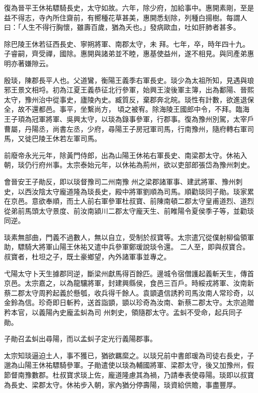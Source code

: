 \begin{pinyinscope}
 復為晉平王休祐驃騎長史，太守如故。六年，除少府，加給事中。惠開素剛，至是益不得志，寺內所住齋前，有嚮種花草甚美，惠開悉刬除，列種白揚樹。每謂人曰：「人生不得行胸懷，雖壽百歲，猶為夭也。」發病歐血，吐如肝肺者甚多。



 除巴陵王休若征西長史、寧朔將軍、南郡太守，未
 拜。七年，卒，時年四十九。子睿嗣，齊受禪，國除。惠開與諸弟並不睦，惠基使益州，遂不相見。與同產弟惠明亦著嫌隙云。



 殷琰，陳郡長平人也。父道鸞，衡陽王義季右軍長史。琰少為太祖所知，見遇與琅邪王景文相埒。初為江夏王義恭征北行參軍，始興王浚後軍主簿，出為鄱陽、晉熙太守，豫州治中從事史，廬陵內史。臧質反，棄郡奔北皖。琰性有計數，欲進退保全，故不還都邑。事平，坐繫尚方，
 頃之被宥。除海陵王國郎中令，不拜。臨海王子頊為冠軍將軍、吳興太守，以琰為錄事參軍，行郡事。復為豫州別駕，太宰戶曹屬，丹陽丞，尚書左丞，少府，尋陽王子房冠軍司馬，行南豫州，隨府轉右軍司馬，又徙巴陵王休若左軍司馬。



 前廢帝永光元年，除黃門侍郎，出為山陽王休祐右軍長史、南梁郡太守。休祐入朝，琰仍行府州事。太宗泰始元年，以休祐為荊州，欲以吏部郎張岱為豫州刺史。



 會晉安王子勛反，即以琰督豫司二州南豫
 州之梁郡諸軍事、建武將軍、豫州刺史，以西汝陰太守龐道隆為琰長史，殿中將軍劉順為司馬。順勸琰同子勛。琰家累在京邑。意欲奉順，而土人前右軍參軍杜叔寶、前陳南頓二郡太守皇甫道烈、道烈從弟前馬頭太守景度、前汝南潁川二郡太守龐天生、前睢陽令夏侯季子等，並勸琰同逆。



 琰素無部曲，門義不過數人，無以自立，受制於叔寶等。太宗遣冗從僕射柳倫領軍助，驃騎大將軍山陽王休祐又遣中兵參軍鄭瑗說琰令還。
 二人至，即與叔寶合。叔寶者，杜坦之子，既土豪鄉望，內外諸軍事並專之。



 弋陽太守卜天生據郡同逆，斷梁州獻馬得百餘匹。邊城令宿僧護起義斬天生，傳首京邑。太宗嘉之，以為龍驤將軍，封建興縣侯，食邑三百戶。時綏戎將軍、汝南新蔡二郡太守周矜起義於懸瓠，收兵得千餘人。袁顗遺信誘矜司馬汝南人常珍奇，以金鈴為信。珍奇即日斬矜，送首詣顗，顗以珍奇為汝南、新蔡二郡太守。太宗追贈矜本官，以義陽內史龐孟虯為司
 州刺史，領隨郡太守。孟虯不受命，起兵同子勛。



 子勛召孟虯出尋陽，而以孟虯子定光行義陽郡事。



 太宗知琰逼迫土人，事不獲已，猶欲羈縻之。以琰兄前中書郎瑗為司徒右長史，子邈為山陽王休祐驃騎參軍。子勛遣使以琰為輔國將軍、梁郡太守，後又加豫州，假節督南豫數郡。杜叔寶求琰上佐，龐道隆慮其為禍，乃請奉表使尋陽。琰即以叔寶為長史、梁郡太守。休祐步入朝，家內猶分停壽陽，琰資給供贍，事盡豐厚。




\end{pinyinscope}
